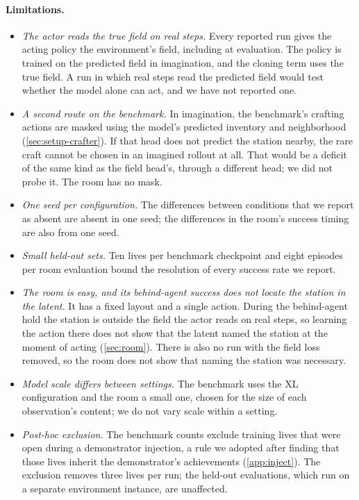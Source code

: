 \paragraph{Limitations.}
\begin{itemize}
  \item \emph{The actor reads the true field on real steps.} Every reported run gives the acting policy the environment's field, including at evaluation. The policy is trained on the predicted field in imagination, and the cloning term uses the true field. A run in which real steps read the predicted field would test whether the model alone can act, and we have not reported one.
  \item \emph{A second route on the benchmark.} In imagination, the benchmark's crafting actions are masked using the model's predicted inventory and neighborhood (\cref{sec:setup-crafter}). If that head does not predict the station nearby, the rare craft cannot be chosen in an imagined rollout at all. That would be a deficit of the same kind as the field head's, through a different head; we did not probe it. The room has no mask.
  \item \emph{One seed per configuration.} The differences between conditions that we report as absent are absent in one seed; the differences in the room's success timing are also from one seed.
  \item \emph{Small held-out sets.} Ten lives per benchmark checkpoint and eight episodes per room evaluation bound the resolution of every success rate we report.
  \item \emph{The room is easy, and its behind-agent success does not locate the station in the latent.} It has a fixed layout and a single action. During the behind-agent hold the station is outside the field the actor reads on real steps, so learning the action there does not show that the latent named the station at the moment of acting (\cref{sec:room}). There is also no run with the field loss removed, so the room does not show that naming the station was necessary.
  \item \emph{Model scale differs between settings.} The benchmark uses the XL configuration and the room a small one, chosen for the size of each observation's content; we do not vary scale within a setting.
  \item \emph{Post-hoc exclusion.} The benchmark counts exclude training lives that were open during a demonstrator injection, a rule we adopted after finding that those lives inherit the demonstrator's achievements (\cref{app:inject}). The exclusion removes three lives per run; the held-out evaluations, which run on a separate environment instance, are unaffected.
\end{itemize}

